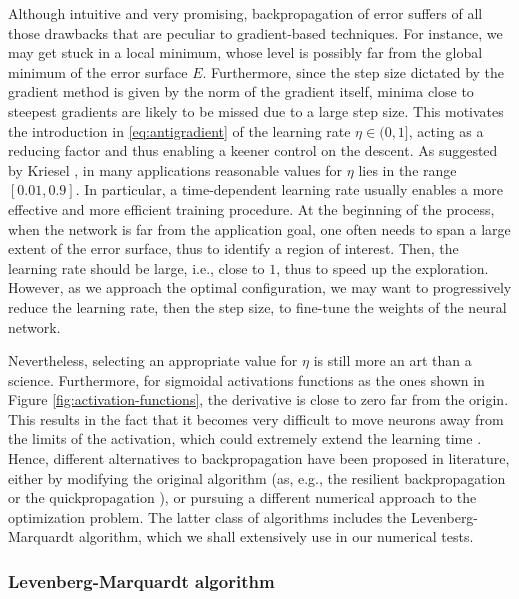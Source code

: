 \documentclass[12pt, a4paper, twoside, openright]{report}
\numberwithin{equation}{chapter}
\theoremstyle{theorem}
\theoremstyle{definition}
\theoremstyle{remark}
\theoremstyle{proposition}
\numberwithin{figure}{chapter}
\begin{document}
		Although intuitive and very promising, backpropagation of error suffers of all those drawbacks that are peculiar to gradient-based techniques. For instance, we may get stuck in a local minimum, whose level is possibly far from the global minimum of the error surface $E$. Furthermore, since the step size dictated by the gradient method is given by the norm of the gradient itself, minima close to steepest gradients are likely to be missed due to a large step size. This motivates the introduction in \eqref{eq:antigradient} of the learning rate $\eta \in (0,1]$, acting as a reducing factor and thus enabling a keener control on the descent. As suggested by Kriesel \cite{Kri}, in many applications reasonable values for $\eta$ lies in the range $[0.01,0.9]$. In particular, a time-dependent learning rate usually enables a more effective and more efficient training procedure. At the beginning of the process, when the network is far from the application goal, one often needs to span a large extent of the error surface, thus to identify a region of interest. Then, the learning rate should be large, i.e., close to $1$, thus to speed up the exploration. However, as we approach the optimal configuration, we may want to progressively reduce the learning rate, then the step size, to fine-tune the weights of the neural network. 
		
		Nevertheless, selecting an appropriate value for $\eta$ is still more an art than a science. Furthermore, for sigmoidal activations functions as the ones shown in Figure \ref{fig:activation-functions}, the derivative is close to zero far from the origin. This results in the fact that it becomes very difficult to move neurons away from the limits of the activation, which could extremely extend the learning time \cite{Kri}. Hence, different alternatives to backpropagation have been proposed in literature, either by modifying the original algorithm (as, e.g., the resilient backpropagation \cite{RB93} or the quickpropagation \cite{Fah88}), or pursuing a different numerical approach to the optimization problem. The latter class of algorithms includes the Levenberg-Marquardt algorithm, which we shall extensively use in our numerical tests.
				
		\subsubsection{Levenberg-Marquardt algorithm}
		\label{section:Levenberg-Marquardt algorithm}
		
\end{document}
